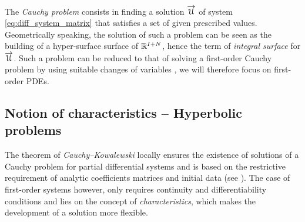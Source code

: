 The \textit{Cauchy problem} consists in finding a solution ${\overrightarrow{\mathcal{U}}}$ of system \eqref{eq:diff_system_matrix} that satisfies a set of given prescribed values. Geometrically speaking, the solution of such a problem can be seen as the building of a hyper-surface surface of $\mathbb{R}^{I+N}$, hence the term of \textit{integral surface} for ${\overrightarrow{\mathcal{U}}}$. Such a problem can be reduced to that of solving a first-order Cauchy problem by using suitable changes of variables \cite[p.54]{PDEs}, we will therefore focus on first-order PDEs.

\subsection{Notion of characteristics -- Hyperbolic problems}
The theorem of \textit{Cauchy--Kowalewski} locally ensures the existence of solutions of a Cauchy problem for partial differential systems and is based on the restrictive requirement of analytic coefficients matrices and initial data (see \cite[p.46]{PDEs}). The case of first-order systems however, only requires continuity and differentiability conditions and lies on the concept of \textit{characteristics}, which makes the development of a solution more flexible.

